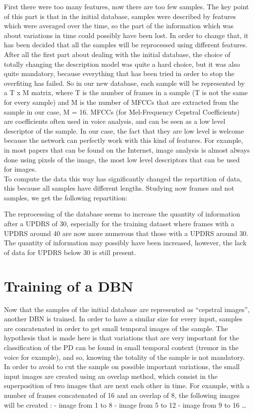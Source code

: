 \documentclass{report}
\begin{document}
		First there were too many features, now there are too few samples. The key point of this part is that in the initial database, samples were described by features which were averaged over the time, so the part of the information which was about variations in time could possibly have been lost. In order to change that, it has been decided that all the samples will be reprocessed using different features. After all the first part about dealing with the initial database, the choice of totally changing the description model was quite a hard choice, but it was also quite mandatory, because everything that has been tried in order to stop the overfiting has failed. So in our new database, each sample will be represented by a T x M matrix, where T is the number of frames in a sample (T is not the same for every sample) and M is the number of MFCCs that are extracted from the sample in our case, M = 16. MFCCs (for Mel-Frequency Cepstral Coefficients) are coefficients often used in voice analysis, and can be seen as a low level descriptor of the sample. In our case, the fact that they are low level is welcome because the network can perfectly work with this kind of features. For example, in most papers that can be found on the Internet, image analysis is almost always done using pixels of the image, the most low level descriptors that can be used for images.\\
		
		To compute the data this way has significantly changed the repartition of data, this because all samples have different lengths. Studying now frames and not samples, we get the following repartition:
		
		
		The reprocessing of the database seems to increase the quantity of information after a UPDRS of 30, especially for the training dataset where frames with a UPDRS around 40 are now more numerous that those with a UPDRS around 30. The quantity of information may possibly have been increased, however, the lack of data for UPDRS below 30 is still present.
		
		\section{Training of a DBN}
		
		 Now that the samples of the initial database are represented as “cepstral images”, another DBN is trained. In order to have a similar size for every input, samples are concatenated in order to get small temporal images of the sample. The hypothesis that is made here is that variations that are very important for the classification of the PD can be found in small temporal context (tremor in the voice for example), and so, knowing the totality of the sample is not mandatory. In order to avoid to cut the sample on possible important variations, the small input images are created using an overlap method, which consist in the superposition of two images that are next each other in time. For example, with a number of frames concatenated of 16 and an overlap of 8, the following images will be created :
		 - image from 1 to 8
		 - image from 5 to 12
		 - image from 9 to 16
		 …
		 
\end{document}
